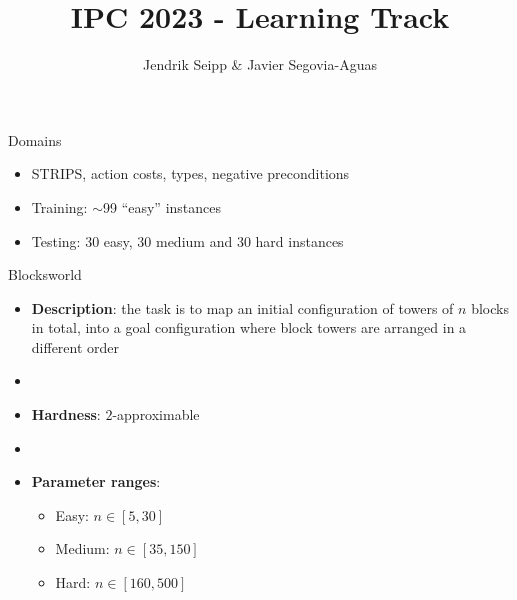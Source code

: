 \documentclass[aspectratio=169,xcolor=dvipsnames]{beamer}
\title[short title]{IPC 2023 - Learning Track} %
\author[Allauthors] {Jendrik Seipp \& Javier Segovia-Aguas}
\date{} %
\begin{document}
\begin{frame}
    \titlepage

\end{frame}

\begin{frame}{Domains}
    \begin{itemize}
        \item STRIPS, action costs, types, negative preconditions
        \item Training: $\sim$99 ``easy'' instances
        \item Testing: 30 easy, 30 medium and 30 hard instances
    \end{itemize}
\end{frame}

\begin{frame}{Blocksworld}

    \begin{itemize}
        \item \textbf{Description}: the task is to map an initial configuration of towers of $n$ blocks in total, into a goal configuration where block towers are arranged in a different order
        \item[]
        \item \textbf{Hardness}: $2$-approximable
        \item[]
        \item \textbf{Parameter ranges}:
        \begin{itemize}
            \item Easy: $n \in [5, 30]$
            \item Medium: $n \in [35, 150]$
            \item Hard: $n \in [160, 500]$
        \end{itemize}
    \end{itemize}

\end{frame}
\end{document}
